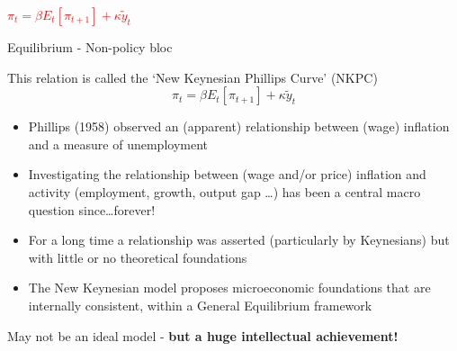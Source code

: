 \documentclass{beamer}
\begin{document}

\begin{frame}

\begin{center}
{\Huge\textcolor{red}{ $\pi_{t} = \beta E_{t}[\pi_{t+1}]  + \kappa \tilde{y}_{t}$}}
\end{center}

\end{frame}


	
\begin{frame}{Equilibrium - Non-policy bloc}

This relation is called the `New Keynesian Phillips Curve' (NKPC)
\begin{equation*}
\pi_{t} = \beta E_{t}[\pi_{t+1}]  + \kappa \tilde{y}_{t}
\end{equation*}

\begin{itemize}
\item	Phillips (1958) observed an (apparent) relationship between (wage) inflation and a measure of unemployment
\item	Investigating the relationship between (wage and/or price) inflation and activity (employment, growth, output gap \ldots) has been a central macro question since\ldots forever!
\item	For a long time a relationship was asserted (particularly by Keynesians) but with little or no theoretical foundations
\item	The New Keynesian model proposes microeconomic foundations that are internally consistent, within a General Equilibrium framework
\end{itemize}

\vspace{2mm}
May not be an ideal model - \textbf{but a huge intellectual achievement!}

\end{frame}


	
\end{document}
